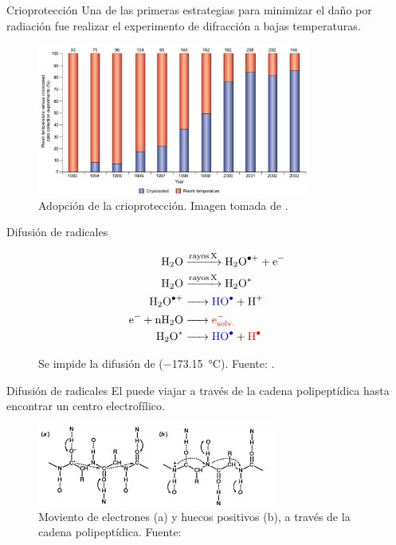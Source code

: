 \documentclass{beamer}
\begin{document}
\begin{frame}{Crioprotección}
Una de las primeras estrategias para minimizar el daño por radiación fue realizar el experimento de difracción a bajas temperaturas.
\begin{figure}[h]
	\centering
	\includegraphics[width=0.8\textwidth]{garman2003.png}
	\caption{Adopción de la crioprotección. Imagen tomada de \cite{Garman2003}.}
	\label{fig:garman2003}
\end{figure}
\end{frame}
\begin{frame}{Difusión de radicales}
\begin{figure}
  \begin{align*}
  \ce{H2O           &->[rayos X]     H2O^{.+}    +             e^{-}}  \\
  \ce{H2O           &->[rayos X]     H2O^{*}}                          \\
  \ce{H2O^{.+}      &->  \color{blue}HO^{.}       +              H^{+}} \\
  \ce{e^{-} + nH2O  &->  \color{red}e^{-}_{solv.}}                     \\
  \ce{H2O^{*}       &->  \color{blue}HO^{.}       +   \color{red}H^{.}}
  \end{align*} 
  \caption{Se impide la difusión de  (\SI{-173.15}{\celsius}). Fuente: \cite{Owen2012a}.}  
  \label{fig:owen2012a}
\end{figure}
\end{frame}
\begin{frame}{Difusión de radicales}
El  puede viajar a través de la cadena polipeptídica hasta encontrar un centro electrofílico. 
\begin{figure}[h]
  \centering
  \includegraphics[width=0.7\textwidth]{symons92.png}
  \caption{Moviento de electrones (a) y huecos positivos (b), a través de la cadena polipeptídica. Fuente: \cite{Symons1992}}
  \label{fig:symons92}
\end{figure}
\end{frame}
\end{document}
